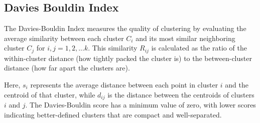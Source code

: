 \subsection{Davies Bouldin Index}

The Davies-Bouldin Index measures the quality of clustering by evaluating the average similarity between each cluster \( C_i \) and its most similar neighboring cluster 
\( C_j \) for $i,j = 1, 2, ... k$. This similarity \( R_{ij} \) is calculated as the ratio of the within-cluster distance (how tightly packed the cluster is) to the between-cluster distance (how far apart the clusters are).


\begin{center}

\end{center}


Here, \( s_i \) represents the average distance between each point in cluster \( i \) and the centroid of that cluster,
while \( d_{ij} \) is the distance between the centroids of clusters \( i \) and \( j \). The Davies-Bouldin score has a
minimum value of zero, with lower scores indicating better-defined clusters that are compact and well-separated.

